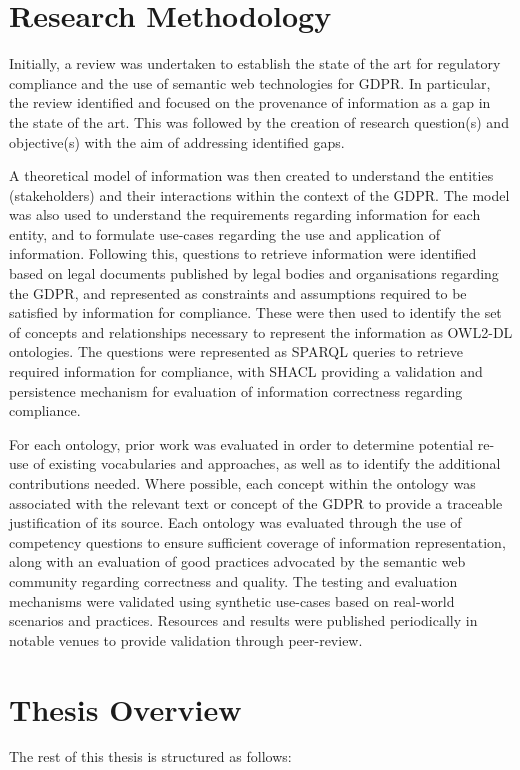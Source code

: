 \section{Research Methodology}
Initially, a review was undertaken to establish the state of the art for regulatory compliance and the use of semantic web technologies for GDPR. In particular, the review identified and focused on the provenance of information as a gap in the state of the art. This was followed by the creation of research question(s) and objective(s) with the aim of addressing identified gaps.

A theoretical model of information was then created to understand the entities (stakeholders) and their interactions within the context of the GDPR. The model was also used to understand the requirements regarding information for each entity, and to formulate use-cases regarding the use and application of information. Following this, questions to retrieve information were identified based on legal documents published by legal bodies and organisations regarding the GDPR, and represented as constraints and assumptions required to be satisfied by information for compliance. These were then used to identify the set of concepts and relationships necessary to represent the information as OWL2-DL ontologies. The questions were represented as SPARQL queries to retrieve required information for compliance, with SHACL providing a validation and persistence mechanism for evaluation of information correctness regarding compliance.

For each ontology, prior work was evaluated in order to determine potential re-use of existing vocabularies and approaches, as well as to identify the additional contributions needed. Where possible, each concept within the ontology was associated with the relevant text or concept of the GDPR to provide a traceable justification of its source. Each ontology was evaluated through the use of competency questions to ensure sufficient coverage of information representation, along with an evaluation of good practices advocated by the semantic web community regarding correctness and quality. The testing and evaluation mechanisms were validated using synthetic use-cases based on real-world scenarios and practices. Resources and results were published periodically in notable venues to provide validation through peer-review.

\section{Thesis Overview}
The rest of this thesis is structured as follows:


